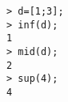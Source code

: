 \begin{center}\begin{minipage}{15cm}\begin{Verbatim}[frame=single]
> d=[1;3];
> inf(d);
1
> mid(d);
2
> sup(4);
4
\end{Verbatim}
\end{minipage}\end{center}
